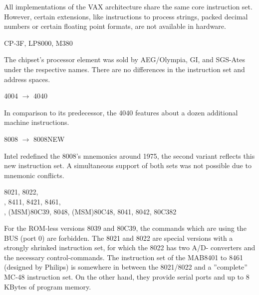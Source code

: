 \documentclass[12pt,twoside]{report}
\begin{document}
All implementations of the VAX architecture share the same
core instruction set.  However, certain extensions, like
instructions to process strings, packed decimal numbers or
certain floating point formats, are not available in hardware.
\begin{cpulist}
   CP-3F, LP8000, M380
\end{cpulist}
The chipset's processor element was sold by AEG/Olympia, GI,
and SGS-Ates under the respective names.  There are no differences
in the instruction set and address spaces.
\begin{cpulist}
   4004 $\rightarrow$ 4040
\end{cpulist}
In comparison to its predecessor, the 4040 features about a dozen
additional machine instructions.
\begin{cpulist}
   8008 $\rightarrow$ 8008NEW
\end{cpulist}
Intel redefined the 8008's mnemonics around 1975, the second variant reflects
this new instruction set.  A simultaneous support of both sets was not
possible due to mnemonic conflicts.
\begin{cpulist}
   8021, 8022, \\
, 8411, 8421, 8461, \\
, (MSM)80C39, 8048, (MSM)80C48, 8041, 8042, 80C382
\end{cpulist}
For the ROM-less versions 8039 and 80C39, the commands which are
using the BUS (port 0) are forbidden.  The 8021 and 8022 are special
versions with a strongly shrinked instruction set, for which the 8022
has two A/D- converters and the necessary control-commands.  The 
instruction set of the MAB8401 to 8461 (designed by Philips) is
somewhere in between the 8021/8022 and a ''complete'' MC-48 instruction
set.  On the other hand, they provide serial ports and up to 8 KBytes
of program memory.
\end{document}
